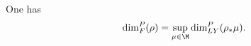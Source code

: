 \begin{theorem}\label{theoremb}
One has \begin{equation} \label{Lyapunov} \dim_F^P(\rho) = \sup_{\mu \in \M}\dim_{LY}^P(\rho_*\mu).\end{equation}
\end{theorem}
